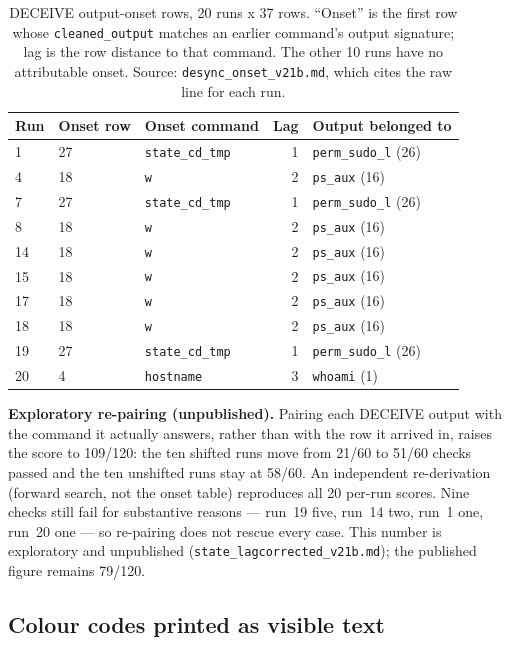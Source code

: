 \documentclass[a4paper,11pt]{article}
\begin{document}
\begin{table}[ht]
\centering
\caption{DECEIVE output-onset rows, 20 runs x 37 rows. ``Onset'' is the first row
whose \texttt{cleaned\_output} matches an earlier command's output signature;
lag is the row distance to that command. The other 10 runs have no attributable
onset. Source: \texttt{desync\_onset\_v21b.md}, which cites the raw line for
each run.}
\label{tab:v21-onset}
\scriptsize
\setlength{\tabcolsep}{3.5pt}
\begin{tabular}{@{}l l l r l@{}}
\toprule
Run & Onset row & Onset command & Lag & Output belonged to \\
\midrule
1 & 27 & \texttt{state\_cd\_tmp} & 1 & \texttt{perm\_sudo\_l} (26) \\
4 & 18 & \texttt{w} & 2 & \texttt{ps\_aux} (16) \\
7 & 27 & \texttt{state\_cd\_tmp} & 1 & \texttt{perm\_sudo\_l} (26) \\
8 & 18 & \texttt{w} & 2 & \texttt{ps\_aux} (16) \\
14 & 18 & \texttt{w} & 2 & \texttt{ps\_aux} (16) \\
15 & 18 & \texttt{w} & 2 & \texttt{ps\_aux} (16) \\
17 & 18 & \texttt{w} & 2 & \texttt{ps\_aux} (16) \\
18 & 18 & \texttt{w} & 2 & \texttt{ps\_aux} (16) \\
19 & 27 & \texttt{state\_cd\_tmp} & 1 & \texttt{perm\_sudo\_l} (26) \\
20 & 4 & \texttt{hostname} & 3 & \texttt{whoami} (1) \\
\bottomrule
\end{tabular}
\end{table}

\textbf{Exploratory re-pairing (unpublished).} Pairing each DECEIVE output with the command it actually answers, rather than with the row it arrived in, raises the score to 109/120: the ten shifted runs move from 21/60 to 51/60 checks passed and the ten unshifted runs stay at 58/60. An independent re-derivation (forward search, not the onset table) reproduces all 20 per-run scores. Nine checks still fail for substantive reasons --- run~19 five, run~14 two, run~1 one, run~20 one --- so re-pairing does not rescue every case. This number is exploratory and unpublished (\texttt{state\_lagcorrected\_v21b.md}); the published figure remains 79/120.

\subsection{Colour codes printed as visible text}
\label{sec:v21-ansi}
\end{document}
